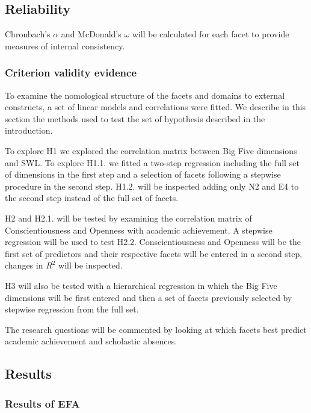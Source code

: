 \documentclass[,man,floatsintext]{apa6}
\begin{document}
\subsection{Reliability}\label{reliability}

Chronbach's \(\alpha\) and McDonald's \(\omega\) will be calculated for
each facet to provide measures of internal consistency.

\subsubsection{Criterion validity
evidence}\label{criterion-validity-evidence}

To examine the nomological structure of the facets and domains to
external constructs, a set of linear models and correlations were
fitted. We describe in this section the methods used to test the set of
hypothesis described in the introduction.

To explore H1 we explored the correlation matrix between Big Five
dimensions and SWL. To explore H1.1. we fitted a two-step regression
including the full set of dimensions in the first step and a selection
of facets following a stepwise procedure in the second step. H1.2. will
be inspected adding only N2 and E4 to the second step instead of the
full set of facets.

H2 and H2.1. will be tested by examining the correlation matrix of
Conscientiousness and Openness with academic achievement. A stepwise
regression will be used to test H2.2. Conscientiousness and Openness
will be the first set of predictors and their respective facets will be
entered in a second step, changes in \(R^2\) will be inspected.

H3 will also be tested with a hierarchical regression in which the Big
Five dimensions will be first entered and then a set of facets
previously selected by stepwise regression from the full set.

The research questions will be commented by looking at which facets best
predict academic achievement and scholastic absences.

\subsection{Results}\label{results}

\subsubsection{Results of EFA}\label{results-of-efa}
\end{document}
